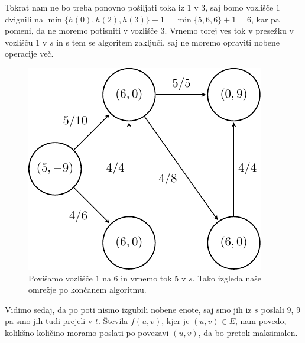\documentclass[mat1]{fmfdelo}
\begin{document}
Tokrat nam ne bo treba ponovno pošiljati toka iz $1$ v $3$, saj bomo vozlišče $1$ dvignili na $\min\{h(0), h(2), h(3)\} +1 = \min\{5,6,6\}+1 = 6$, kar
pa pomeni, da ne moremo potisniti v vozlišče $3$. Vrnemo torej ves tok v presežku v vozlišču $1$ v $s$ in s tem se algoritem zaključi, saj ne moremo
opraviti nobene operacije več.

\begin{figure}[H]
  \centering
  \includegraphics{images/graf2-16.pdf}
  \caption{Povišamo vozlišče $1$ na $6$ in vrnemo tok $5$ v $s$. Tako izgleda naše omrežje po končanem algoritmu.}
\end{figure}

Vidimo sedaj, da po poti nismo izgubili nobene enote, saj smo jih iz $s$ poslali $9$, $9$ pa smo jih tudi prejeli v $t$. Števila $f(u,v)$, kjer je $(u,v) \in E$,
nam povedo, kolikšno količino moramo poslati po povezavi $(u,v)$, da bo pretok maksimalen.

\end{document}
